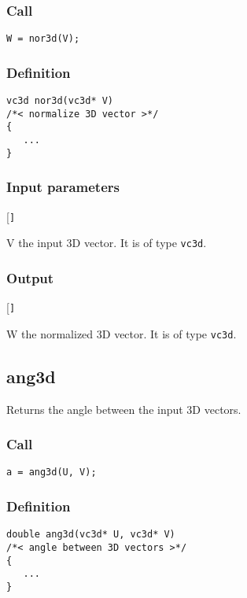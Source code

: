 \subsubsection*{Call}
\begin{verbatim}W = nor3d(V);\end{verbatim}

\subsubsection*{Definition}
\begin{verbatim}
vc3d nor3d(vc3d* V)
/*< normalize 3D vector >*/
{
   ...
}
\end{verbatim}

\subsubsection*{Input parameters}
\begin{desclist}{\tt }{\quad}[\tt ]
   \setlength\itemsep{0pt}
   \item[V] the input 3D vector. It is of type \texttt{vc3d}.
\end{desclist}

\subsubsection*{Output}
\begin{desclist}{\tt }{\quad}[\tt ]
   \setlength\itemsep{0pt}
   \item[W] the normalized 3D vector. It is of type \texttt{vc3d}.
\end{desclist}




\subsection{{ang3d}}
Returns the angle between the input 3D vectors. 

\subsubsection*{Call}
\begin{verbatim}a = ang3d(U, V);\end{verbatim}

\subsubsection*{Definition}
\begin{verbatim}
double ang3d(vc3d* U, vc3d* V)
/*< angle between 3D vectors >*/
{
   ...   
}
\end{verbatim}

